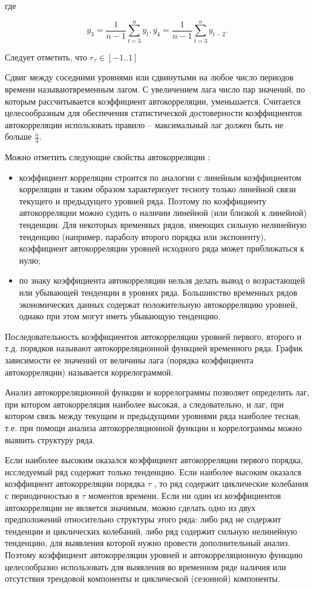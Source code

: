 где

\begin{equation}
\overline{y_3}=\frac{1}{n-1}\sum_{t=3}^{n}y_t , \overline{y_4}=\frac{1}{n-1}\sum_{t=3}^{n}y_{t-2}.
\end{equation}

Следует отметить, что $r_{\tau} \in [-1..1]$ 

Сдвиг между соседними уровнями или сдвинутыми на любое число периодов времени называютвременным лагом. С увеличением лага число пар значений, по которым рассчитывается коэффициент автокорреляции, уменьшается. Считается целесообразным для обеспечения статистической достоверности коэффициентов автокорреляции использовать правило – максимальный лаг должен быть не больше $\frac{n}{4}$.

Можно отметить следующие свойства автокорреляции \cite{hyndman}:

\begin{itemize}
	\item коэффициент корреляции строится по аналогии с линейным коэффициентом корреляции и таким образом характеризует тесноту только линейной связи текущего и предыдущего уровней ряда. Поэтому по коэффициенту автокорреляции можно судить о наличии линейной (или близкой к линейной) тенденции. Для некоторых временных рядов, имеющих сильную нелинейную тенденцию (например, параболу второго порядка или экспоненту), коэффициент автокорреляции уровней исходного ряда может приближаться к нулю;
	\item по знаку коэффициента автокорреляции нельзя делать вывод о возрастающей или убывающей тенденции в уровнях ряда. Большинство временных рядов экономических данных содержат положительную автокорреляцию уровней, однако при этом могут иметь убывающую тенденцию.
\end{itemize}

Последовательность коэффициентов автокорреляции уровней первого, второго и т.д. порядков называют автокорреляционной функцией временного ряда. График зависимости ее значений от величины лага (порядка коэффициента автокорреляции) называется коррелограммой.

Анализ автокорреляционной функции и коррелограммы позволяет определить лаг, при котором автокорреляция наиболее высокая, а следовательно, и лаг, при котором связь между текущим и предыдущими уровнями ряда наиболее тесная, т.е. при помощи анализа автокорреляционной функции и коррелограммы можно выявить структуру ряда.

Если наиболее высоким оказался коэффициент автокорреляции первого порядка, исследуемый ряд содержит только тенденцию. Если наиболее высоким оказался коэффициент автокорреляции порядка $ \tau $ , то ряд содержит циклические колебания с периодичностью в $\tau$ моментов времени. Если ни один из коэффициентов автокорреляции не является значимым, можно сделать одно из двух предположений относительно структуры этого ряда: либо ряд не содержит тенденции и циклических колебаний, либо ряд содержит сильную нелинейную тенденцию, для выявления которой нужно провести дополнительный анализ. Поэтому коэффициент автокорреляции уровней и автокорреляционную функцию целесообразно использовать для выявления во временном ряде наличия или отсутствия трендовой компоненты и циклической (сезонной) компоненты.

